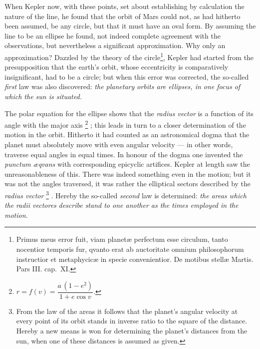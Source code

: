 \documentclass[12pt,a4paper]{book}
\renewcommand{\thefootnote}{*)}
\begin{document}
When Kepler now, with these points, set about establishing by calculation the nature of the line, he found
that the orbit of Mars could not, as had hitherto been assumed, be any circle, but that it must have an
oval form. By assuming the line to be an ellipse he found, not indeed complete agreement with the
observations, but nevertheless a significant approximation. Why only an approximation? Dazzled by the
theory of the circle\footnote{%
Primus meus error fuit, viam planetæ perfectum esse circulum, tanto nocentior temporis fur, qvanto erat ab
auctoritate omnium philosophorum instructior et metaphycicæ in specie convenientior. De motibus stellæ
Martis. Pars III. cap.\ XI.}, Kepler had started from the presupposition that the earth's orbit, whose
eccentricity is comparatively insignificant, had to be a circle; but when this error was corrected, the
so-called \emph{first} law was also discovered: \emph{the planetary orbits are ellipses, in one focus of
which the sun is situated.}

The polar equation for the ellipse shows that the \textit{radius vector} is a function of its angle with
the major axis%
\renewcommand{\thefootnote}{**)}%
\footnote{%
$r = f(v) = \dfrac{a\,(1 - e^{2})}{1 + e \cos v}.$}%
\renewcommand{\thefootnote}{*)}%
; this leads in turn to a closer determination of the motion in the orbit. Hitherto it had counted as an
astronomical dogma that the planet must absolutely move with even angular velocity --- in other words,
traverse equal angles in equal times. In honour of the dogma one invented the \textit{punctum æqvans} with
corresponding epicyclic artifices. Kepler at length saw the unreasonableness of this. There was indeed
something even in the motion; but it was not the angles traversed, it was rather the elliptical sectors
described by the \textit{radius vector}%
\renewcommand{\thefootnote}{***)}%
\footnote{%
From the law of the areas it follows that the planet's angular velocity at every point of its orbit stands
in inverse ratio to the square of the distance. Hereby a new means is won for determining the planet's
distances from the sun, when one of these distances is assumed as given.}%
\renewcommand{\thefootnote}{*)}%
. Hereby the so-called
\emph{second} law is determined: \emph{the areas which the} \textit{radii vectores} \emph{describe stand to
one another as the times employed in the motion.}
\end{document}
